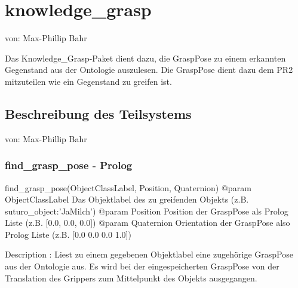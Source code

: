 \documentclass{suturo}
\makeatletter
\newcommand{\chapterauthor}[1]{%
  {\parindent0pt\vspace*{-27pt}%
  \linespread{0}\small\begin{flushright}von: #1\end{flushright}%
  \par\nobreak\vspace*{0pt}}
  \@afterheading%
}
\makeatother
\begin{document}
\section{knowledge\_grasp}
\chapterauthor{Max-Phillip Bahr}
Das Knowledge\_Grasp-Paket dient dazu, die GraspPose zu einem erkannten Gegenstand aus der Ontologie auszulesen. Die GraspPose dient dazu dem PR2 mitzuteilen wie ein Gegenstand zu greifen ist.

\begin{figure}[!htb]
\end{figure}
      
\subsection{Beschreibung des Teilsystems}
\chapterauthor{Max-Phillip Bahr}

\subsubsection{find\_grasp\_pose - Prolog}
\begin{spverbatim}
find_grasp_pose(ObjectClassLabel, Position, Quaternion)
@param ObjectClassLabel Das Objektlabel des zu greifenden Objekts 
       (z.B. suturo_object:'JaMilch')
@param Position Position der GraspPose als Prolog Liste (z.B. [0.0, 0.0, 0.0])
@param Quaternion Orientation der GraspPose also Prolog Liste 
       (z.B. [0.0 0.0 0.0 1.0])

Description : Liest zu einem gegebenen Objektlabel eine zugehörige GraspPose 
aus der Ontologie aus. Es wird bei der eingespeicherten GraspPose von der 
Translation des Grippers zum Mittelpunkt des Objekts ausgegangen.
\end{spverbatim}
\end{document}

